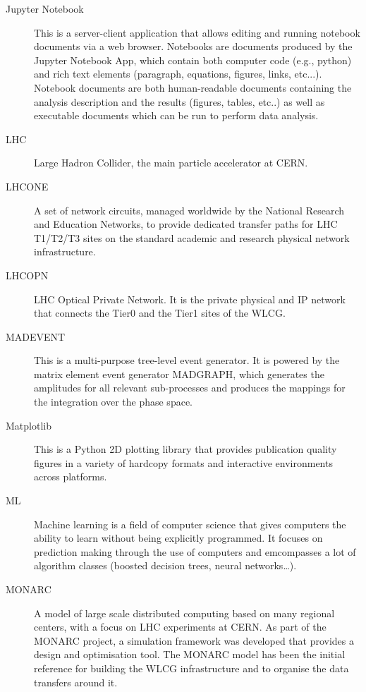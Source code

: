 \documentclass[12pt,a4paper]{article}
\begin{document}
\begin{appendices}
\begin{description}
\item[Jupyter Notebook] This is a server-client application that allows
editing and running notebook documents via a web browser. Notebooks are
documents produced by the Jupyter Notebook App, which contain both
computer code (e.g., python) and rich text elements (paragraph,
equations, figures, links, etc...). Notebook documents are both
human-readable documents containing the analysis description and the
results (figures, tables, etc..) as well as executable documents which
can be run to perform data analysis.

\item[LHC] Large Hadron Collider, the main particle accelerator at CERN.

\item[LHCONE] A set of network circuits, managed worldwide by the National
Research and Education Networks, to provide dedicated transfer paths for
LHC T1/T2/T3 sites on the standard academic and research physical
network infrastructure.

\item[LHCOPN] LHC Optical Private Network. It is the private physical and IP
network that connects the Tier0 and the Tier1 sites of the WLCG.

\item[MADEVENT] This is a multi-purpose tree-level event generator. It is
powered by the matrix element event generator MADGRAPH, which generates
the amplitudes for all relevant sub-processes and produces the mappings
for the integration over the phase space.

\item[Matplotlib] This is a Python 2D plotting library that provides
publication quality figures in a variety of hardcopy formats and
interactive environments across platforms.

\item[ML] Machine learning is a field of computer science that gives computers
the ability to learn without being explicitly programmed. It focuses on
prediction making through the use of computers and emcompasses a lot of
algorithm classes (boosted decision trees, neural networks\ldots{}).

\item[MONARC] A model of large scale distributed computing based on many
regional centers, with a focus on LHC experiments at CERN. As part of
the MONARC project, a simulation framework was developed that provides a
design and optimisation tool. The MONARC model has been the initial
reference for building the WLCG infrastructure and to organise the data
transfers around it.


\end{description}
\end{appendices}
\end{document}

